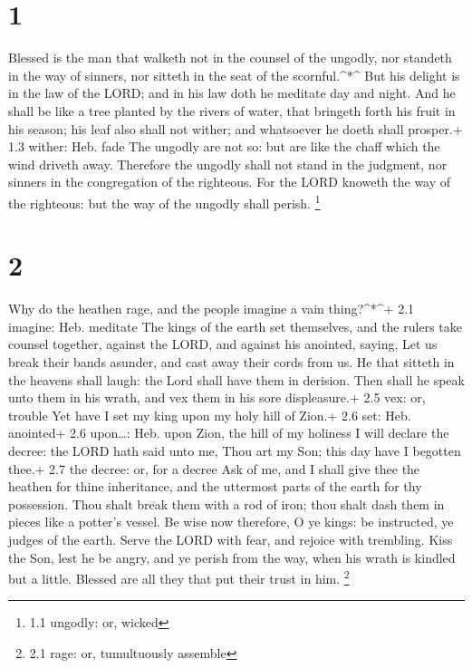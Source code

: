 \hypertarget{section}{%
\section{1}\label{section}}

 Blessed is the man that walketh not in the counsel of the
ungodly, nor standeth in the way of sinners, nor sitteth in the seat of
the scornful.\^{}*\^{}  But his delight is in the law of the
LORD; and in his law doth he meditate day and night.  And he
shall be like a tree planted by the rivers of water, that bringeth forth
his fruit in his season; his leaf also shall not wither; and whatsoever
he doeth shall prosper.+ 1.3 wither: Heb. fade  The ungodly
are not so: but are like the chaff which the wind driveth away.
 Therefore the ungodly shall not stand in the judgment, nor
sinners in the congregation of the righteous.  For the LORD
knoweth the way of the righteous: but the way of the ungodly shall
perish. \footnote{1.1 ungodly: or, wicked}

\hypertarget{section-1}{%
\section{2}\label{section-1}}

 Why do the heathen rage, and the people imagine a vain
thing?\^{}*\^{}+ 2.1 imagine: Heb. meditate  The kings of
the earth set themselves, and the rulers take counsel together, against
the LORD, and against his anointed, saying,  Let us break
their bands asunder, and cast away their cords from us.  He
that sitteth in the heavens shall laugh: the Lord shall have them in
derision.  Then shall he speak unto them in his wrath, and
vex them in his sore displeasure.+ 2.5 vex: or, trouble  Yet
have I set my king upon my holy hill of Zion.+ 2.6 set: Heb. anointed+
2.6 upon\ldots: Heb. upon Zion, the hill of my holiness  I
will declare the decree: the LORD hath said unto me, Thou art my Son;
this day have I begotten thee.+ 2.7 the decree: or, for a decree
 Ask of me, and I shall give thee the heathen for thine
inheritance, and the uttermost parts of the earth for thy possession.
 Thou shalt break them with a rod of iron; thou shalt dash
them in pieces like a potter's vessel.  Be wise now
therefore, O ye kings: be instructed, ye judges of the earth.
 Serve the LORD with fear, and rejoice with trembling.
 Kiss the Son, lest he be angry, and ye perish from the
way, when his wrath is kindled but a little. Blessed are all they that
put their trust in him. \footnote{2.1 rage: or, tumultuously assemble}

